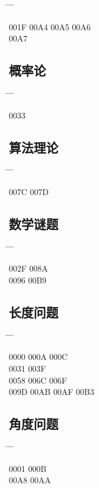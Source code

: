 \documentclass[twoside, twocolumn]{ctexart}
\newenvironment{problist}{
  \begin{center} \ttfamily \begin{tabbing}
      \hspace{50pt} \= \hspace{50pt} \= \hspace{50pt} \= \kill
  }{ \end{tabbing} \end{center} }
\begin{document}
  \begin{problist}
    001F \> 00A4 \> 00A5 \> 00A6 \\ 00A7 \\
  \end{problist}

  \subsection*{概率论}

  \begin{problist}
    0033   \\
  \end{problist}

  \subsection*{算法理论}

  \begin{problist}
    007C \> 007D \\
  \end{problist}

  \subsection*{数学谜题}

  \begin{problist}
    002F   \> 008A \\ 0096 \> 00B9 \\
  \end{problist}

  \subsection*{长度问题}

  \begin{problist}
    0000 \> 000A \> 000C  \\ 0031 \> 003F   \\
    0058 \> 006C \> 006F  \\ 009D \> 00AB \> 00AF \> 00B3 \\
  \end{problist}

  \subsection*{角度问题}

  \begin{problist}
    0001  \> 000B  \\ 00A8 \> 00AA \\
  \end{problist}
\end{document}
